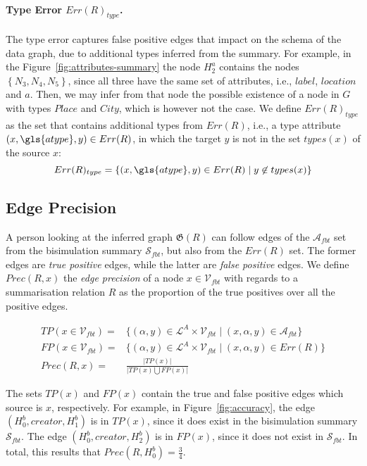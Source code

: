 \paragraph{Type Error $Err(R)_{type}$.}

The type error captures false positive edges that impact on the schema of the data graph, due to additional types inferred from the summary.
For example, in the Figure~\ref{fig:attributes-summary} the node $H^a_2$ contains the nodes $\left\lbrace N_3, N_4, N_5 \right\rbrace$, since all three have the same set of attributes, i.e., $label$, $location$ and $a$. Then, we may infer from that node the possible existence of a node in $G$ with types $Place$ and $City$, which is however not the case. We define $Err(R)_{type}$ as the set that contains additional types from $Err(R)$, i.e., a type attribute $(x, \gls{atype}, y) \in Err(R)$, in which the target $y$ is not in the set $types(x)$ of the source $x$:
$$
Err(R)_{type} = \left\lbrace (x, \gls{atype}, y) \in Err(R) \mid y \not \in types(x) \right\rbrace
$$

\subsection{Edge Precision}
\label{sec:edge-precision}

A person looking at the inferred graph $\mathfrak{G}(R)$ can follow edges of the $\mathcal{A}_{fbt}$ set from the bisimulation summary $\mathcal{S}_{fbt}$, but also from the $Err(R)$ set. The former edges are \emph{true positive} edges, while the latter are \emph{false positive} edges. We define $Prec(R, x)$ the \emph{edge precision} of a node $x \in \mathcal{V}_{fbt}$ with regards to a summarisation relation $R$ as the proportion of the true positives over all the positive edges.

$$
\begin{aligned}
TP(x \in \mathcal{V}_{fbt}) = & \{ (\alpha, y) \in \mathcal{L}^A \times \mathcal{V}_{fbt} \mid (x, \alpha, y) \in \mathcal{A}_{fbt} \} \\
FP(x \in \mathcal{V}_{fbt}) = & \{ (\alpha, y) \in \mathcal{L}^A \times \mathcal{V}_{fbt} \mid (x, \alpha, y) \in Err(R) \} \\
Prec(R, x) = & \frac{\vert TP(x) \vert}{\vert TP(x) \bigcup FP(x) \vert}
\end{aligned}
$$

The sets $TP(x)$ and $FP(x)$ contain the true and false positive edges which source is $x$, respectively. For example, in Figure~\ref{fig:accuracy}, the edge $(H^b_0, creator, H^b_1)$ is in $TP(x)$, since it does exist in the bisimulation summary $\mathcal{S}_{fbt}$. The edge $(H^b_0, creator, H^b_2)$ is in $FP(x)$, since it does not exist in $\mathcal{S}_{fbt}$. In total, this results that $Prec\left(R, H^b_0\right) = \frac{3}{4}$.

